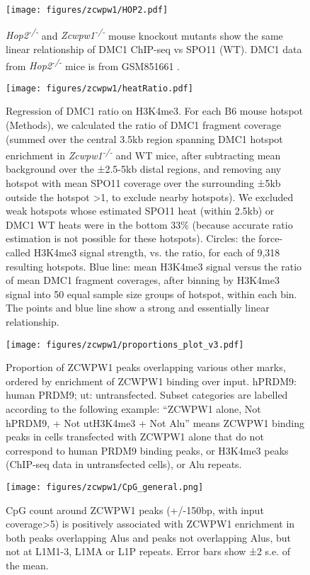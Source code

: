 \begin{figure}[H]
	\centering
	\texttt{[image: figures/zcwpw1/HOP2.pdf]}
	\caption[HOP2 KO Phenocopying]{
		\textit{Hop2\textsuperscript{-/-}} and \textit{Zcwpw1\textsuperscript{-/-}} mouse knockout mutants show the same linear relationship of DMC1 ChIP-seq vs SPO11 (WT).
		DMC1 data from \textit{Hop2\textsuperscript{-/-}} mice is from GSM851661 \parencite{Khil2012Sensitive}.
	}
	\label{fig:HOP2}
\end{figure}


\begin{figure}[H]
	\centering
	\texttt{[image: figures/zcwpw1/heatRatio.pdf]}
	\caption[DMC1 ratio regression]{
		Regression of DMC1 ratio on H3K4me3.
		For each B6 mouse hotspot (Methods), we calculated the ratio of DMC1 fragment coverage (summed over the central 3.5kb region spanning DMC1 hotspot enrichment in \textit{Zcwpw1\textsuperscript{-/-}} and WT mice, after subtracting mean background over the ±2.5-5kb distal regions, and removing any hotspot with mean SPO11 coverage over the surrounding ±5kb outside the hotspot >1, to exclude nearby hotspots).
		We excluded weak hotspots whose estimated SPO11 heat (within 2.5kb) or DMC1 WT heats were in the bottom 33\% (because accurate ratio estimation is not possible for these hotspots).
		Circles: the force-called H3K4me3 signal strength, vs. the ratio, for each of 9,318 resulting hotspots.
		Blue line: mean H3K4me3 signal versus the ratio of mean DMC1 fragment coverages, after binning by H3K4me3 signal into 50 equal sample size groups of hotspot, within each bin.
		The points and blue line show a strong and essentially linear relationship.
	}
	\label{fig:heatRatio}
\end{figure}


\begin{figure}[H]
	\centering
	\texttt{[image: figures/zcwpw1/proportions\_plot\_v3.pdf]}
	\caption[ChIPseq peaks proportions]{
		Proportion of ZCWPW1 peaks overlapping various other marks, ordered by enrichment of ZCWPW1 binding over input.
		hPRDM9: human PRDM9; ut: untransfected.
		Subset categories are labelled according to the following example: “ZCWPW1 alone, Not hPRDM9, + Not utH3K4me3 + Not Alu” means ZCWPW1 binding peaks in cells transfected with ZCWPW1 alone that do not correspond to human PRDM9 binding peaks, or H3K4me3 peaks (ChIP-seq data in untransfected cells), or Alu repeats.
	}
	\label{fig:proportions}
\end{figure}


\begin{figure}[H]
	\centering
	\texttt{[image: figures/zcwpw1/CpG\_general.png]}
	\caption[CpG counts for various repeats]{
		CpG count around ZCWPW1 peaks (+/-150bp, with input coverage>5) is positively associated with ZCWPW1 enrichment in both peaks overlapping Alus and peaks not overlapping Alus, but not at L1M1-3, L1MA or L1P repeats.
		Error bars show ±2 s.e. of the mean. 
	}
	\label{fig:CpG_general}
\end{figure}
